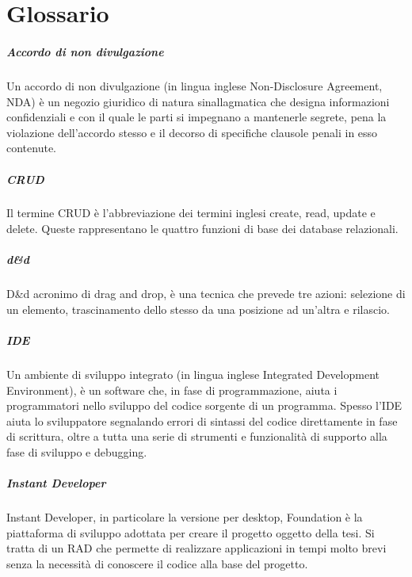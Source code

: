 \chapter{Glossario}

\paragraph{Accordo di non divulgazione}
\label{NDA}
Un accordo di non divulgazione (in lingua inglese Non-Disclosure Agreement, NDA) è un negozio giuridico di natura sinallagmatica che designa informazioni confidenziali e con il quale le parti si impegnano a mantenerle segrete, pena la violazione dell'accordo stesso e il decorso di specifiche clausole penali in esso contenute. \hyperref[bib13]{\cite{[13]}}

\paragraph{CRUD}
\label{CRUD}
Il termine CRUD è l'abbreviazione dei termini inglesi create, read, update e delete. Queste rappresentano le quattro funzioni di base dei database relazionali.

\paragraph{d\&d}
\label{draganddrop}
D\&d acronimo di drag and drop, è una tecnica che prevede tre azioni: selezione di un elemento, trascinamento dello stesso da una posizione ad un'altra e rilascio.

\paragraph{IDE}
\label{IDE}
Un ambiente di sviluppo integrato (in lingua inglese Integrated Development Environment), è un software che, in fase di programmazione, aiuta i programmatori nello sviluppo del codice sorgente di un programma. 
Spesso l'IDE aiuta lo sviluppatore segnalando errori di sintassi del codice direttamente in fase di scrittura, oltre a tutta una serie di strumenti e funzionalità di supporto alla fase di sviluppo e debugging. \hyperref[bib11]{\cite{[16]}}

\paragraph{Instant Developer}
\label{InDe}
Instant Developer, in particolare la versione per desktop, Foundation è la piattaforma di sviluppo adottata per creare il progetto oggetto della tesi. Si tratta di un RAD che permette di realizzare applicazioni in tempi molto brevi senza la necessità di conoscere il codice alla base del progetto.


